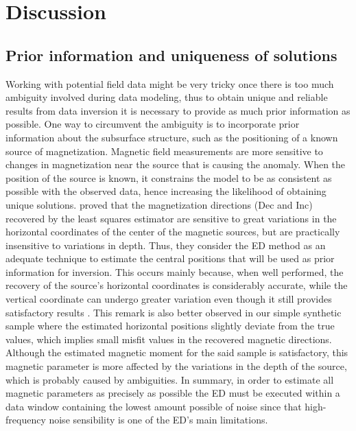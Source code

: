 \section{Discussion}

\subsection{Prior information and uniqueness of solutions}

Working with potential field data might be very tricky once there is too much ambiguity involved during data modeling, thus to obtain unique and reliable results from data inversion it is necessary to provide as much prior information as possible.
One way to circumvent the ambiguity is to incorporate prior information about the subsurface structure, such as the positioning of a known source of magnetization.
Magnetic field measurements are more sensitive to changes in magnetization near the source that is causing the anomaly.
When the position of the source is known, it constrains the model to be as consistent as possible with the observed data, hence increasing the likelihood of obtaining unique solutions.
\citet{Oliveira2015Estimation} proved that the magnetization directions (Dec and Inc) recovered by the least squares estimator are sensitive to great variations in the horizontal coordinates of the center of the magnetic sources, but are practically insensitive to variations in depth.
Thus, they consider the ED method as an adequate technique to estimate the central positions that will be used as prior information for inversion.
This occurs mainly because, when well performed, the recovery of the source's horizontal coordinates is considerably accurate, while the vertical coordinate can undergo greater variation even though it still provides satisfactory results \citep{Silva20033D, Melo2013}.
This remark is also better observed in our simple synthetic sample where the estimated horizontal positions slightly deviate from the true values, which implies small misfit values in the recovered magnetic directions.
Although the estimated magnetic moment for the said sample is satisfactory, this magnetic parameter is more affected by the variations in the depth of the source, which is probably caused by ambiguities.
In summary, in order to estimate all magnetic parameters as precisely as possible the ED must be executed within a data window containing the lowest amount possible of noise since that high-frequency noise sensibility is one of the ED's main limitations.

